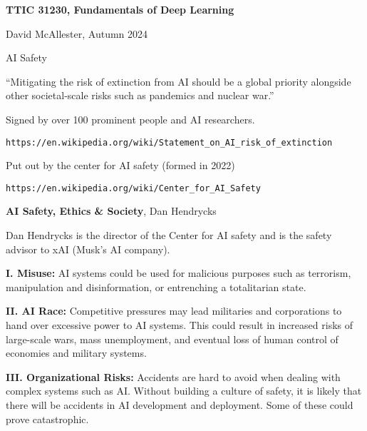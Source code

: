 




{\Huge

\centerline{\bf TTIC 31230, Fundamentals of Deep Learning}

\bigskip
\centerline{David McAllester, Autumn  2024}

\vfill
\centerline{AI Safety}

\vfill\vfill


``Mitigating the risk of extinction from AI should be a global priority alongside other societal-scale risks such as pandemics and nuclear war.''

\vfill
Signed by over 100 prominent people and AI researchers.

\vfill
{\huge
\begin{verbatim}
https://en.wikipedia.org/wiki/Statement_on_AI_risk_of_extinction
\end{verbatim}
}

\vfill
Put out by the center for AI safety (formed in 2022)

\vfill
{\huge
\begin{verbatim}
https://en.wikipedia.org/wiki/Center_for_AI_Safety
\end{verbatim}
}

{\bf AI Safety, Ethics \& Society}, Dan Hendrycks

\vfill
Dan Hendrycks is the director of the Center for AI safety and is the safety advisor to xAI (Musk's AI company).

\vfill


{\bf I. Misuse:} AI systems could be used for malicious purposes such as terrorism, manipulation and disinformation, or entrenching a totalitarian state.

\vfill
{\bf II. AI Race:} Competitive pressures may lead militaries and corporations to hand over excessive power to AI systems. This could result in increased risks of large-scale wars, mass unemployment, and eventual loss of human control of economies and military systems.


{\bf III. Organizational Risks:} Accidents are hard to avoid when dealing with complex systems such as AI. Without building a culture of safety, it is likely that there will be accidents in AI development and deployment. Some of these could prove catastrophic.

}
